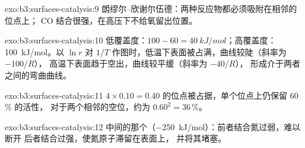 \begin{solution}{exo:b3:surfaces-catalysis:9}
朗缪尔–欣谢尔伍德：两种反应物都必须吸附在相邻的位点上；
CO 结合很强，在高压下不给氧留出位置。
\end{solution}

\begin{solution}{exo:b3:surfaces-catalysis:10}
低覆盖度：$100 - 60 = \qty{40}{kJ/mol}$；高覆盖度：\qty{100}{kJ/mol}。以 $\ln r$ 对
$1/T$ 作图时，低温下表面被占满，曲线较陡（斜率为 $-100/R$），
高温下表面趋于空出，曲线较平缓（斜率为 $-40/R$），
形成介于两者之间的弯曲曲线。
\end{solution}

\begin{solution}{exo:b3:surfaces-catalysis:11}
$4 \times 0.10 = 0.40$ 的位点被占据，单个位点上仍保留 60\,\% 的活性，
对于两个相邻的空位，约为 $0.60^2 = 36\,\%$。
\end{solution}

\begin{solution}{exo:b3:surfaces-catalysis:12}
中间的那个（\qty{-250}{kJ/mol}）：前者结合氮过弱，难以断开 
后者结合过强，使氮原子滞留在表面上，
并将其堵塞。
\end{solution}

